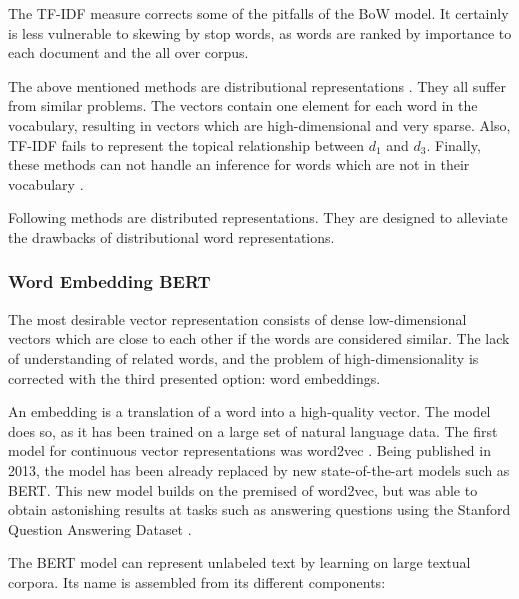             The \ac{TF-IDF} measure corrects some of the pitfalls of the \ac{BoW} model. It certainly is less vulnerable to skewing by stop words,  as words are ranked by importance to each document and the all over corpus. 
            
        
            The above mentioned methods are distributional representations \cite{practicalNLP}. They all suffer from similar problems. The vectors contain one element for each word in the vocabulary, resulting in vectors which are high-dimensional and very sparse. Also, \ac{TF-IDF} fails to represent the topical relationship between $ d_{1} $ and $ d_{3}$. Finally, these methods can not handle an inference for words which are not in their vocabulary \cite{practicalNLP}.
            
            Following methods are distributed representations. They are designed to alleviate the drawbacks of distributional word representations.
            
            \subsubsection{Word Embedding BERT}
             The most desirable vector representation consists of dense low-dimensional vectors which are close to each other if the words are considered similar. The lack of understanding of related words, and the problem of high-dimensionality is corrected with the third presented option: word embeddings.
            
            An embedding is a translation of a word into a high-quality vector. The model does so, as it has been trained on a large set of natural language data. The first model for continuous vector representations was word2vec \cite{word2vec2013}. Being published in 2013, the model has been already replaced by new state-of-the-art models such as \acs{BERT}. This new model builds on the premised of word2vec, but was able to obtain astonishing results at tasks such as answering questions using the Stanford Question Answering Dataset \cite{BERT}. 
            
            The \ac{BERT} model can represent unlabeled text by learning on large textual corpora. Its name is assembled from its different components:
            
